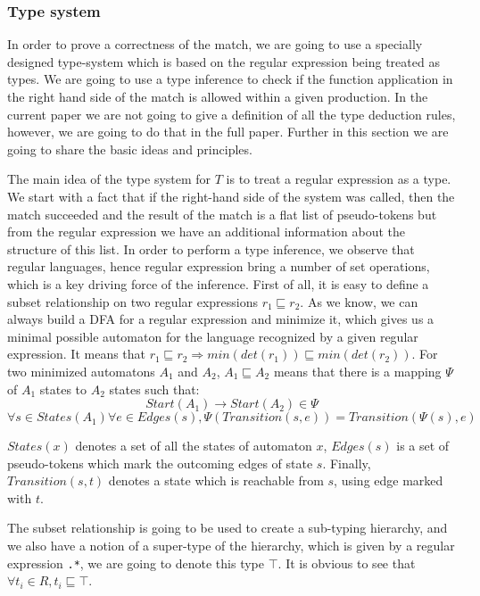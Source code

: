 \subsubsection{Type system}
In order to prove a correctness of the match, we are going to use
a specially designed type-system which is based on the regular 
expression being treated as types.  We are going to use a type
inference to check if the function application in the right hand
side of the match is allowed within a given production.  In the
current paper we are not going to give a definition of all the
type deduction rules, however, we are going to do that in the 
full paper.  Further in this section we are going to share the
basic ideas and principles.

The main idea of the type system for $T$ is to treat a regular
expression as a type.  We start with a fact that if the 
right-hand side of the system was called, then the match succeeded
and the result of the match is a flat list of pseudo-tokens
but from the regular expression we have an additional information
about the structure of this list.  In order to perform a type 
inference, we observe that regular languages, hence regular 
expression bring a number of set operations, which is a key
driving force of the inference.  First of all, it is easy to
define a subset relationship on two regular expressions
$r_1 \sqsubseteq r_2$.  As we know, we can always build a DFA for
a regular expression and minimize it, which gives us a minimal
possible automaton for the language recognized by a given regular
expression.  It means that $r_1 \sqsubseteq r_2 \Rightarrow 
min (det (r_1)) \sqsubseteq min (det (r_2))$.  For two minimized 
automatons $A_1$ and $A_2$, $A_1 \sqsubseteq A_2$ means that there
is a mapping $\Psi$ of $A_1$ states to $A_2$ states such that:
\[
    Start (A_1) \to Start (A_2) \in \Psi
\]
\[
    \forall s \in States (A_1) \forall e \in Edges (s),
    \Psi (Transition (s, e)) = Transition (\Psi (s), e)
\]

$States (x)$ denotes a set of all the states of automaton $x$,
$Edges (s)$ is a set of pseudo-tokens which mark the outcoming
edges of state $s$.  Finally, $Transition (s, t)$ denotes a
state which is reachable from $s$, using edge marked with $t$.

The subset relationship is going to be used to create a sub-typing
hierarchy, and we also have a notion of a super-type of
the hierarchy, which is given by a regular expression \verb|.*|,
we are going to denote this type $\top$.  It is obvious to see that
$\forall t_i \in R, t_i \sqsubseteq \top$.

